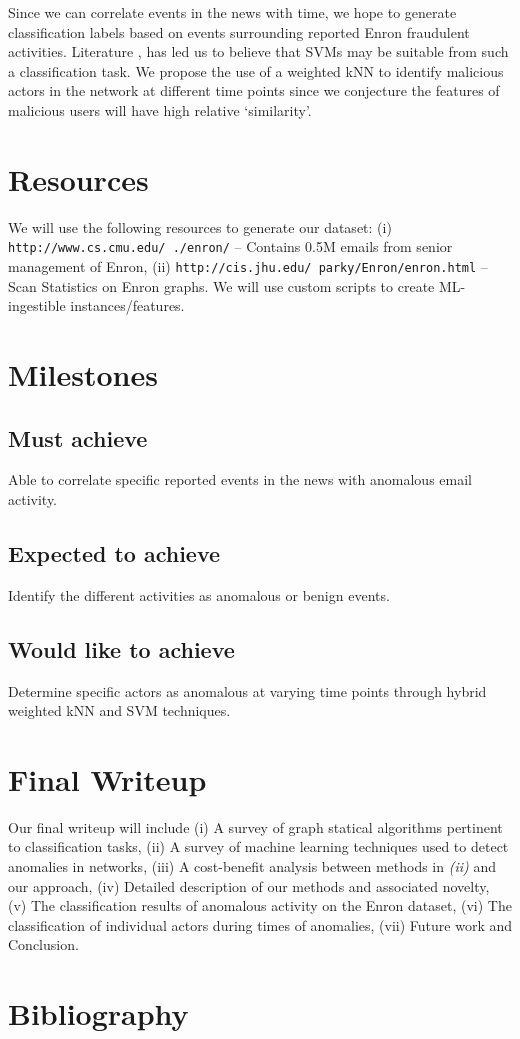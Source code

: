 \documentclass[10pt]{article}
\begin{document}
Since we can correlate events in the news with time, we hope to generate classification labels based on events
surrounding reported Enron fraudulent activities. Literature \cite{shon2007hybrid}, \cite{shon2005machine} has 
led us to believe that SVMs may be suitable from such a classification task. We propose the use of a weighted kNN to 
identify malicious actors in the network at different time points since we conjecture the features of malicious users will 
have high relative `similarity'.

\section{Resources}
We will use the following resources to generate our dataset: (i) \texttt{http://www.cs.cmu.edu/~./enron/} -- Contains 0.5M 
emails from senior management of Enron, (ii) \texttt{http://cis.jhu.edu/~parky/Enron/enron.html} -- Scan Statistics on
Enron graphs. We will use custom scripts to create ML-ingestible instances/features.

\section{Milestones}
\subsection{Must achieve}
Able to correlate specific reported events in the news with anomalous email activity. 
\subsection{Expected to achieve}
Identify the different activities as anomalous or benign events.
\subsection{Would like to achieve}
Determine specific actors as anomalous at varying time points through hybrid weighted kNN and SVM techniques.

\section{Final Writeup}
Our final writeup will include (i) A survey of graph statical algorithms pertinent to classification tasks, 
(ii) A survey of machine learning techniques used to detect anomalies in networks, 
(iii) A cost-benefit analysis between methods in \textit{(ii)} and our approach,
(iv) Detailed description of our methods and associated novelty,
(v) The classification results of anomalous activity on the Enron dataset,
(vi) The classification of individual actors during times of anomalies,
(vii) Future work and Conclusion.
 
\section{Bibliography}

{\small

}
\end{document}

